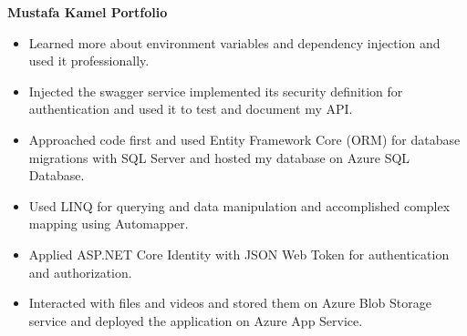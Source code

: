 {\bfseries Mustafa Kamel Portfolio}\hspace{0.5cm}{\small Sep. 2022 -- Oct. 2022}
\begin{itemize}
    \item Learned more about environment variables and dependency injection and used it professionally.
    \item Injected the swagger service implemented its security definition for authentication and used it to test and document my API.
    \item Approached code first and used Entity Framework Core (ORM) for database migrations with SQL Server and hosted my database on Azure SQL Database.
    \item Used LINQ for querying and data manipulation and accomplished complex mapping using Automapper.
    \item Applied ASP.NET Core Identity with JSON Web Token for authentication and authorization.
    \item Interacted with files and videos and stored them on Azure Blob Storage service and deployed the application on Azure App Service.
\end{itemize}
